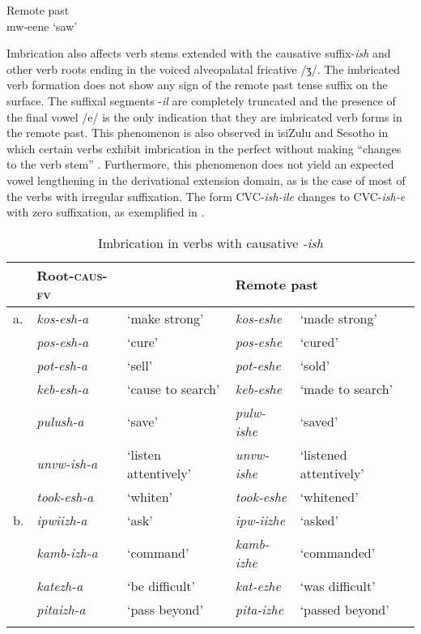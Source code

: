 \documentclass[output=paper]{langsci/langscibook}
\begin{document}
   \ex\label{ex:8b.kawasha} Remote past \\
     mw-eene ‘saw’ \\
\z
\z 

Imbrication also affects verb stems extended with the causative suffix-\textit{ish} and other verb roots ending in the voiced alveopalatal fricative /ʒ/. The imbricated verb formation does not show any sign of the remote past tense suffix on the surface. The suffixal segments -\textit{il} are completely truncated and the presence of the final vowel /e/ is the only indication that they are imbricated verb forms in the remote past. This phenomenon is also observed in isiZulu and Sesotho in which certain verbs exhibit imbrication in the perfect without making “changes to the verb stem” \citep{monich2015}. Furthermore, this phenomenon does not yield an expected vowel lengthening in the derivational extension domain, as is the case of most of the verbs with irregular suffixation. The form CVC-\textit{ish-ile} changes to CVC-\textit{ish-e} with zero suffixation, as exemplified in .

\begin{table}
\begin{tabularx}{\textwidth}{llXll}
\lsptoprule
 & Root-\textsc{caus}-\textsc{fv} &  &\multicolumn{2}{l}{Remote past} \\
\midrule
a. & \textit{kos-esh-a} & `make strong' & \textit{kos-eshe} & `made strong' \\
 & \textit{pos-esh-a} & `cure' & \textit{pos-eshe} & `cured' \\
 & \textit{pot-esh-a} & `sell' & \textit{pot-eshe} & `sold' \\
 & \textit{keb-esh-a} & `cause to search' & \textit{keb-eshe} & `made to search' \\
 & \textit{pulush-a} & `save' & \textit{pulw-ishe} & `saved' \\
 & \textit{unvw-ish-a} & `listen attentively' & \textit{unvw-ishe} & `listened attentively' \\
 & \textit{took-esh-a} & `whiten' & \textit{took-eshe} & `whitened' \\
\tablevspace
b. & \textit{ipwiizh-a} & `ask' & \textit{ipw-iizhe} & `asked' \\
 & \textit{kamb-izh-a} & `command' & \textit{kamb-izhe} & `commanded' \\
 & \textit{katezh-a} & `be difficult' & \textit{kat-ezhe} & `was difficult' \\
 & \textit{pitaizh-a} & `pass beyond' & \textit{pita-izhe} & `passed beyond' \\

\lspbottomrule
\end{tabularx}

\caption{Imbrication in verbs with causative \textit{-ish}}
\label{tab:24.kawasha}

\end{table}
\end{document}
